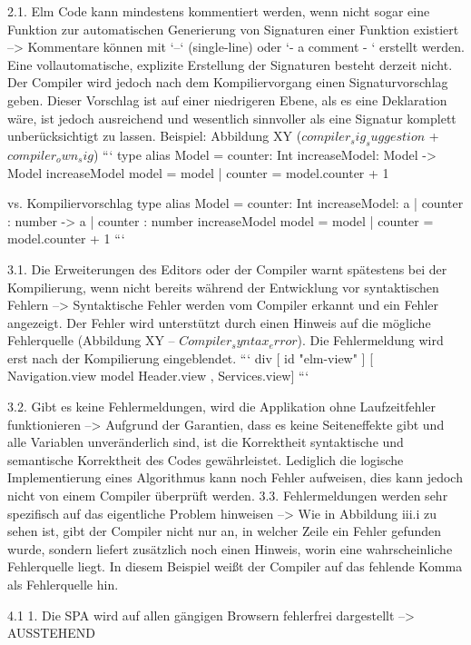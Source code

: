  2.1. Elm Code kann mindestens kommentiert werden, wenn nicht sogar eine Funktion zur automatischen Generierung von Signaturen einer Funktion existiert
 --> Kommentare können mit `--` (single-line) oder `{- a comment - }` erstellt werden. Eine vollautomatische, explizite Erstellung der Signaturen besteht derzeit nicht. Der Compiler wird jedoch nach dem Kompiliervorgang einen Signaturvorschlag geben. Dieser Vorschlag ist auf einer niedrigeren Ebene, als es eine Deklaration wäre, ist jedoch ausreichend und wesentlich sinnvoller als eine Signatur komplett unberücksichtigt zu lassen. Beispiel: Abbildung XY ($compiler_sig_suggestion$ + $compiler_own_sig$)
 ```
 type alias Model = { counter: Int }
 increaseModel: Model -> Model
 increaseModel model =
     {model | counter = model.counter + 1}
 
 vs. Kompiliervorschlag
 type alias Model = { counter: Int }
 increaseModel: { a | counter : number } -> { a | counter : number }
 increaseModel model =
     {model | counter = model.counter + 1}
 ```
 
 3.1. Die Erweiterungen des Editors oder der Compiler warnt spätestens bei der Kompilierung, wenn nicht bereits während der Entwicklung vor syntaktischen Fehlern
 --> Syntaktische Fehler werden vom Compiler erkannt und ein Fehler angezeigt. Der Fehler wird unterstützt durch einen Hinweis auf die mögliche Fehlerquelle (Abbildung XY – $Compiler_syntax_error$). Die Fehlermeldung wird erst nach der Kompilierung eingeblendet.
 ```
 div [ id "elm-view" ]
         [ Navigation.view model
             Header.view
         , Services.view]
 ```
 
 3.2. Gibt es keine Fehlermeldungen, wird die Applikation ohne Laufzeitfehler funktionieren
 --> Aufgrund der Garantien, dass es keine Seiteneffekte gibt und alle Variablen unveränderlich sind, ist die Korrektheit syntaktische und semantische Korrektheit des Codes gewährleistet. Lediglich die logische Implementierung eines Algorithmus kann noch Fehler aufweisen, dies kann jedoch nicht von einem Compiler überprüft werden.
 3.3. Fehlermeldungen werden sehr spezifisch auf das eigentliche Problem hinweisen
 --> Wie in Abbildung iii.i zu sehen ist, gibt der Compiler nicht nur an, in welcher Zeile ein Fehler gefunden wurde, sondern liefert zusätzlich noch einen Hinweis, worin eine wahrscheinliche Fehlerquelle liegt. In diesem Beispiel weißt der Compiler auf das fehlende Komma als Fehlerquelle hin.
 
 4.1  1. Die SPA wird auf allen gängigen Browsern fehlerfrei dargestellt
 --> AUSSTEHEND
 
